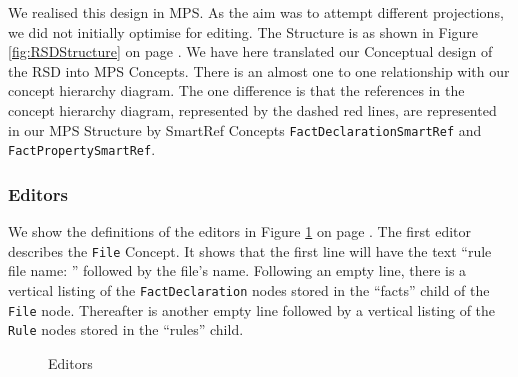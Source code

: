 We realised this design in MPS.
As the aim was to attempt different projections, we did not initially optimise for editing.
The Structure is as shown in Figure \ref{fig:RSDStructure} on page \pageref{fig:RSDStructure}.
We have here translated our Conceptual design of the RSD into MPS Concepts.
There is an almost one to one relationship with our concept hierarchy diagram.
The one difference is that the references in the concept hierarchy diagram, represented by the dashed red lines, are represented in our MPS Structure by SmartRef Concepts \texttt{FactDeclarationSmartRef} and \texttt{FactPropertySmartRef}.

\subsubsection{Editors}

We show the definitions of the editors in Figure \ref{fig:RSDEditors} on page \pageref{fig:RSDEditors}. 
The first editor describes the \texttt{File} Concept. 
It shows that the first line will have the text ``rule file name: '' followed by the file's name.
Following an empty line, there is a vertical listing of the \texttt{FactDeclaration} nodes stored in the ``facts'' child of the \texttt{File} node.
Thereafter is another empty line followed by a vertical listing of the \texttt{Rule} nodes stored in the ``rules'' child.

\begin{figure}[htbp]
    \centering
    \caption{Editors}
    \label{fig:RSDEditors}
\end{figure}

